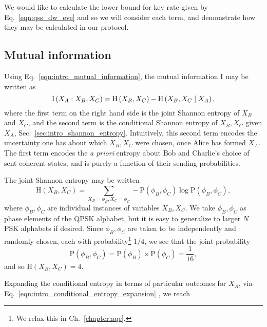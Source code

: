 We would like to calculate the lower bound for key rate given by Eq.~\ref{eqn:qss_dw_eve} and so we will consider each term, and demonstrate how they may be calculated in our protocol.



\subsection{Mutual information}

Using Eq.~\ref{eqn:intro_mutual_information}, the mutual information $\text{I}$ may be written as 
\begin{equation}\label{eqn:qss_deriv_1}
\text{I}\left(X_A : X_B, X_C\right) = \text{H}\left(X_B, X_C\right) - \text{H} \left(X_B, X_C \; \middle| \; X_A\right),
\end{equation}
where the first term on the right hand side is the joint Shannon entropy of $X_B$ and $X_C$, and the second term is the conditional Shannon entropy of $X_B, X_C$ given $X_A$, Sec.~\ref{sec:intro_shannon_entropy}. Intuitively, this second term encodes the uncertainty one has about which $X_B, X_C$ were chosen, once Alice has formed $X_A$. The first term encodes the \emph{a priori} entropy about Bob and Charlie's choice of sent coherent states, and is purely a function of their sending probabilities.

The joint Shannon entropy may be written
\begin{equation}\label{eqn:qss_deriv_2}
\text{H}\left(X_B, X_C\right) = \sum_{X_B=\phi_B, X_C=\phi_C} - \text{P}\left(\phi_B, \phi_C\right) \log \text{P}\left(\phi_B, \phi_C\right),
\end{equation}
where $\phi_B, \phi_C$ are individual instances of variables $X_B, X_C$. We take $\phi_B, \phi_C$ as phase elements of the QPSK alphabet, but it is easy to generalize to larger $N$PSK alphabets if desired. Since $\phi_B, \phi_C$ are taken to be independently and randomly chosen, each with probability\footnote{We relax this in Ch.~\ref{chapter:aqc}.} $1/4$, we see that the joint probability
\begin{equation}\label{eqn:qss_deriv_3}
\text{P}\left(\phi_B, \phi_C\right) = \text{P}\left(\phi_B\right)\times \text{P}\left(\phi_C\right) = \frac{1}{16},
\end{equation}
and so $\text{H}\left(X_B, X_C\right) = 4$. 

Expanding the conditional entropy in terms of particular outcomes for $X_A$, via Eq.~\ref{eqn:intro_conditional_entropy_expansion}%
, we reach

